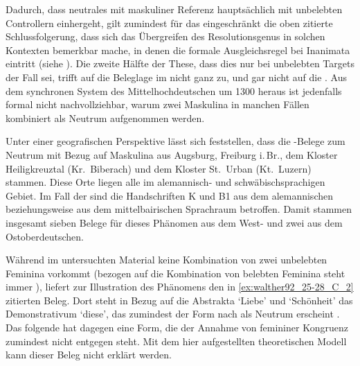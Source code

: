 Dadurch, dass neutrales  mit maskuliner Referenz hauptsächlich mit
unbelebten Controllern einhergeht, gilt zumindest für das \CAO{}
eingeschränkt die oben zitierte Schlussfolgerung, dass sich das Übergreifen des
Resolutionsgenus in solchen Kontexten bemerkbar mache, in denen die formale
Ausgleichsregel bei Inanimata eintritt (siehe ). Die
zweite Hälfte der These, dass dies nur bei unbelebten Targets der Fall sei,
trifft auf die Beleglage im \CAO{} nicht ganz zu, und gar nicht auf
die \KC{}. Aus dem synchronen System des Mittelhochdeutschen um 1300
heraus ist jedenfalls formal nicht nachvollziehbar, warum zwei Maskulina in
manchen Fällen kombiniert als Neutrum aufgenommen werden.

Unter einer geografischen Perspektive lässt sich feststellen, dass die
\CAO{}-Belege zum Neutrum mit Bezug auf Maskulina aus Augsburg,
Freiburg i.\,Br., dem Kloster Heiligkreuztal (Kr.~Biberach) und dem Kloster
St.~Urban (Kt.~Luzern) stammen. Diese Orte liegen alle im alemannisch- und
schwäbischsprachigen Gebiet. Im Fall der \KC{} sind die Handschriften
K und B1 aus dem alemannischen beziehungsweise aus dem
mittelbairischen Sprachraum betroffen. Damit stammen insgesamt sieben Belege
für dieses Phänomen aus dem West- und zwei aus dem Ost\-ober\-deutschen.

Während im untersuchten Material keine Kombination von zwei unbelebten Feminina
vorkommt (bezogen auf die Kombination von belebten Feminina steht immer
), liefert \citet[384]{paul2007} zur Illustration des Phänomens
den in \cref{ex:walther92_25-28_C_2} zitierten Beleg. Dort steht in Bezug auf
die Abstrakta  `Liebe' und  `Schönheit' das
Demonstrativum  `diese', das zumindest der Form nach als
Neutrum erscheint \autocite[485]{ksw2}. Das folgende  hat dagegen
eine Form, die der Annahme von femininer Kongruenz zumindest nicht entgegen
steht. Mit dem hier aufgestellten theoretischen Modell kann dieser Beleg nicht
erklärt werden.

